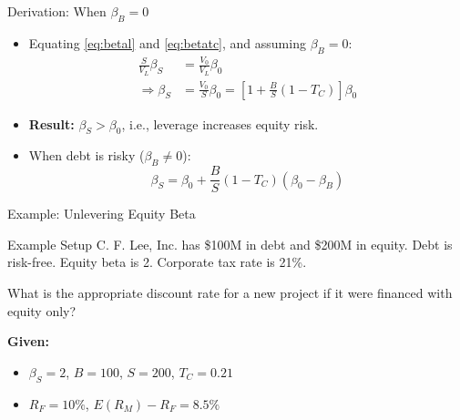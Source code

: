 \begin{frame}{Derivation: When $\beta_B = 0$}
	
	\begin{itemize}
		\item Equating \eqref{eq:betal} and \eqref{eq:betatc}, and assuming $\beta_B = 0$:
		\begin{align*}
			\frac{S}{V_L} \beta_S &= \frac{V_0}{V_L} \beta_0\\
			\Rightarrow \beta_S &= \frac{V_0}{S} \beta_0 = \left[1 + \frac{B}{S}(1 - T_C)\right] \beta_0
		\end{align*}
		
		\item \textbf{Result:} $\beta_S > \beta_0$, i.e., leverage increases equity risk.
		
		\pause
		\item When debt is risky ($\beta_B \neq 0$):
		\begin{equation*}
			\beta_S = \beta_0 + \frac{B}{S}(1 - T_C)(\beta_0 - \beta_B)
		\end{equation*}
	\end{itemize}
	
\end{frame}

\begin{frame}{Example: Unlevering Equity Beta}
	
	\begin{block}{Example Setup}
		C. F. Lee, Inc. has \$100M in debt and \$200M in equity. Debt is risk-free. Equity beta is 2. Corporate tax rate is 21\%.
		
		\vspace{0.2cm}
		What is the appropriate discount rate for a new project if it were financed with equity only?
	\end{block}
	
	\vspace{0.2cm}
	\textbf{Given:}
	\begin{itemize}
		\item $\beta_S = 2$, $B = 100$, $S = 200$, $T_C = 0.21$
		\item $R_F = 10\%$, $E(R_M) - R_F = 8.5\%$
	\end{itemize}
	
\end{frame}

